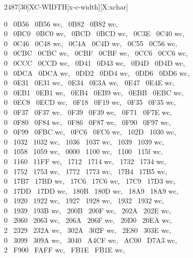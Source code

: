 \begin{worddef}{2487}[30]{XC-WIDTH}[x-c-width][X:xchar]
\begin{implement}
	0 ~0B56 ~0B56 wc, ~0B82 ~0B82 wc,\\
	0 ~0BC0 ~0BC0 wc, ~0BCD ~0BCD wc, ~0C3E ~0C40 wc,\\
	0 ~0C46 ~0C48 wc, ~0C4A ~0C4D wc, ~0C55 ~0C56 wc,\\
	0 ~0CBC ~0CBC wc, ~0CBF ~0CBF wc, ~0CC6 ~0CC6 wc,\\
	0 ~0CCC ~0CCD wc, ~0D41 ~0D43 wc, ~0D4D ~0D4D wc,\\
	0 ~0DCA ~0DCA wc, ~0DD2 ~0DD4 wc, ~0DD6 ~0DD6 wc,\\
	0 ~0E31 ~0E31 wc, ~0E34 ~0E3A wc, ~0E47 ~0E4E wc,\\
	0 ~0EB1 ~0EB1 wc, ~0EB4 ~0EB9 wc, ~0EBB ~0EBC wc,\\
	0 ~0EC8 ~0ECD wc, ~0F18 ~0F19 wc, ~0F35 ~0F35 wc,\\
	0 ~0F37 ~0F37 wc, ~0F39 ~0F39 wc, ~0F71 ~0F7E wc,\\
	0 ~0F80 ~0F84 wc, ~0F86 ~0F87 wc, ~0F90 ~0F97 wc,\\
	0 ~0F99 ~0FBC wc, ~0FC6 ~0FC6 wc, ~102D ~1030 wc,\\
	0 ~1032 ~1032 wc, ~1036 ~1037 wc, ~1039 ~1039 wc,\\
	0 ~1058 ~1059 wc, ~0000 ~1100 wc, ~1100 ~115f wc,\\
	0 ~1160 ~11FF wc, ~1712 ~1714 wc, ~1732 ~1734 wc,\\
	0 ~1752 ~1753 wc, ~1772 ~1773 wc, ~17B4 ~17B5 wc,\\
	0 ~17B7 ~17BD wc, ~17C6 ~17C6 wc, ~17C9 ~17D3 wc,\\
	0 ~17DD ~17DD wc, ~180B ~180D wc, ~18A9 ~18A9 wc,\\
	0 ~1920 ~1922 wc, ~1927 ~1928 wc, ~1932 ~1932 wc,\\
	0 ~1939 ~193B wc, ~200B ~200F wc, ~202A ~202E wc,\\
	0 ~2060 ~2063 wc, ~206A ~206F wc, ~20D0 ~20EA wc,\\
	2 ~2329 ~232A wc, ~302A ~302F wc, ~2E80 ~303E wc,\\
	0 ~3099 ~309A wc, ~3040 ~A4CF wc, ~AC00 ~D7A3 wc,\\
	2 ~F900 ~FAFF wc, ~FB1E ~FB1E wc,\tab[2]

\end{implement}
\end{worddef}
